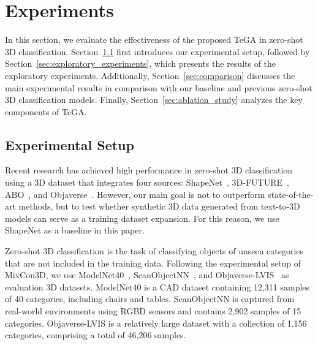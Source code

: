 

% 


\section{Experiments}
In this section, we evaluate the effectiveness of the proposed TeGA in zero-shot 3D classification. Section~\ref{sec:experimental_setup} first introduces our experimental setup, followed by Section~\ref{sec:exploratory_experiments}, which presents the results of the exploratory experiments. Additionally, Section~\ref{sec:comparison} discusses the main experimental results in comparison with our baseline and previous zero-shot 3D classification models. Finally, Section~\ref{sec:ablation_study} analyzes the key components of TeGA.

\subsection{Experimental Setup} 
\label{sec:experimental_setup} 
Recent research has achieved high performance in zero-shot 3D classification using a 3D dataset that integrates four sources: ShapeNet~\cite{chang2015shapenet}, 3D-FUTURE~\cite{fu20213d}, ABO~\cite{collins2022abo}, and Objaverse~\cite{deitke2023objaverse}. 
However, our main goal is not to outperform state-of-the-art methods, but to test whether synthetic 3D data generated from text-to-3D models can serve as a training dataset expansion. For this reason, we use ShapeNet as a baseline in this paper.

Zero-shot 3D classification is the task of classifying objects of unseen categories that are not included in the training data. Following the experimental setup of MixCon3D, we use ModelNet40~\cite{wu20153d}, ScanObjectNN~\cite{uy2019revisiting}, and Objaverse-LVIS~\cite{deitke2023objaverse} as evaluation 3D datasets. ModelNet40 is a CAD dataset containing 12,311 samples of 40 categories, including chairs and tables. ScanObjectNN is captured from real-world environments using RGBD sensors and contains 2,902 samples of 15 categories. Objaverse-LVIS is a relatively large dataset with a collection of 1,156 categories, comprising a total of 46,206 samples.


